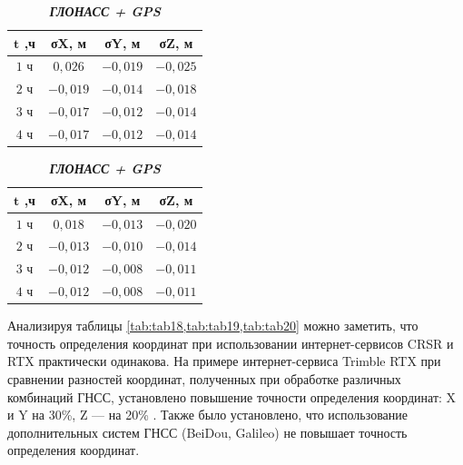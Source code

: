 \begin{table} [htbp]
	\centering\small
	\label{tab:tab20}{%
			\hfill
			\begin{subtable}{.33\linewidth}	
				\centering
				\caption*{\textbf{\textit{GPS}}}
				\begin{tabular}{|c|c|c|c|}
					\hline
					$\mathbf{t}$ \textbf{,ч}   & \textbf{σX, м}    & \textbf{σY, м}  & \textbf{σZ, м} \\ \hline
					$1$ ч                      & $ 0,026$          & $-0,019$        & $-0,025$        \\ \hline
					$2$ ч                      & $-0,019$          & $-0,014$        & $-0,018$        \\ \hline
					$3$ ч                      & $-0,017$          & $-0,012$        & $-0,014$        \\ \hline
					$4$ ч	                   & $-0,017$          & $-0,012$        & $-0,014$        \\ \hline
				\end{tabular}
			\end{subtable}%
			\qquad
			\begin{subtable}{.33\linewidth}	
				\centering
				\caption*{\textbf{\textit{ГЛОНАСС + GPS}}}
				\begin{tabular}{|c|c|c|c|}
					\hline
					$\mathbf{t}$ \textbf{,ч}   & \textbf{σX, м}    & \textbf{σY, м}  & \textbf{σZ, м}  \\ \hline
					$1$ ч                      & $ 0,018$          & $-0,013$        & $-0,020$        \\ \hline
					$2$ ч                      & $-0,013$          & $-0,010$        & $-0,014$        \\ \hline
					$3$ ч                      & $-0,012$          & $-0,008$        & $-0,011$        \\ \hline
					$4$ ч	                   & $-0,012$          & $-0,008$        & $-0,011$        \\ \hline
				\end{tabular}
			\end{subtable}\hfill%
		}
	\end{table}
	
Анализируя таблицы \cref{tab:tab18,tab:tab19,tab:tab20} можно заметить, что точность определения координат при использовании интернет-сервисов CRSR и RTX практически одинакова. 
На примере интернет-сервиса Trimble RTX при сравнении разностей координат, полученных при обработке различных комбинаций ГНСС, установлено повышение точности определения координат: X и Y на 30\%, Z --- на 20\% \cite{mak01,src83,src88,src89}.
Также было установлено, что использование дополнительных систем ГНСС (BeiDou, Galileo) не повышает точность определения координат.

